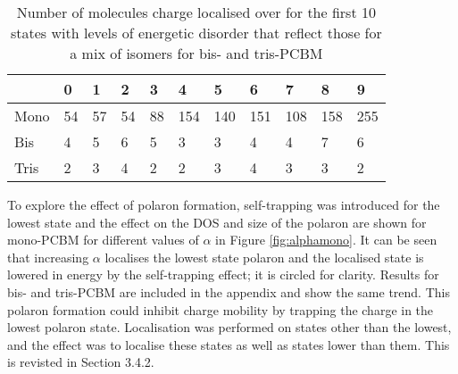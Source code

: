 \documentclass[a4paper,12pt]{article}
\begin{document}
\begin{table}[H]
\caption{Number of molecules charge localised over for the first 10 states with levels of energetic disorder that reflect those for a mix of isomers for bis- and tris-PCBM}
\centering
\begin{tabular}{lllllllllll}
\hline
     & 0                         & 1                          & 2                          & 3  & 4   & 5   & 6   & 7   & 8   & 9   \\ \hline
Mono & 54                        & \cellcolor[HTML]{FFFFFF}57 & \cellcolor[HTML]{FFFFFF}54 & 88 & 154 & 140 & 151 & 108 & 158 & 255 \\
Bis  & \cellcolor[HTML]{FFFFFF}4 & \cellcolor[HTML]{FFFFFF}5  & 6                          & 5  & 3   & 3   & 4   & 4   & 7   & 6   \\
Tris & 2                         & 3                          & 4                          & 2  & 2   & 3   & 4   & 3   & 3   &   2  \\ \hline
\end{tabular}
\label{table:dis}
\end{table}

\noindent To explore the effect of polaron formation, self-trapping was introduced for the lowest state and the effect on the DOS and size of the polaron are shown for mono-PCBM for different values of $\alpha$ in Figure \ref{fig:alphamono}. It can be seen that increasing $\alpha$ localises the lowest state polaron and the localised state is lowered in energy by the self-trapping effect; it is circled for clarity.  Results for bis- and tris-PCBM are included in the appendix and show the same trend. This polaron formation could inhibit charge mobility by trapping the charge in the lowest polaron state. Localisation was performed on states other than the lowest, and the effect was to localise these states as well as states lower than them. This is revisted in Section 3.4.2.
\end{document}
